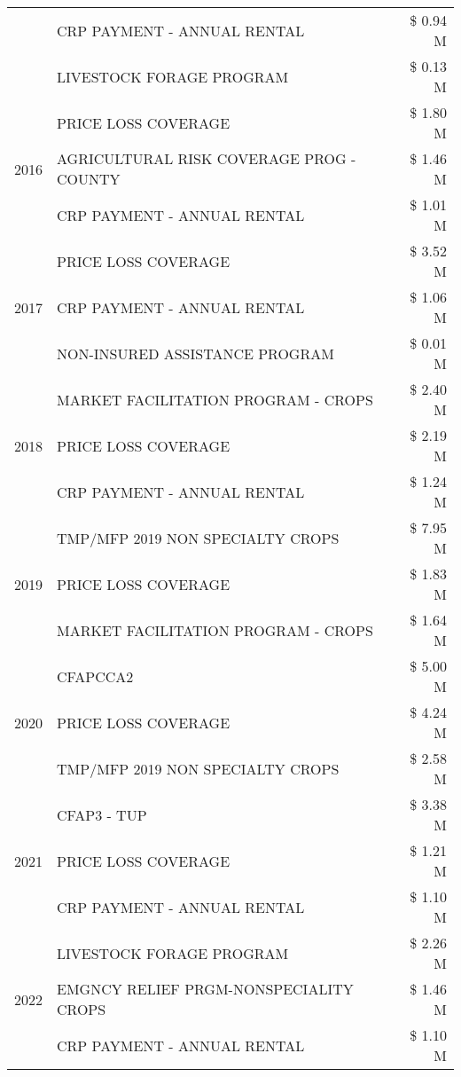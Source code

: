 \begin{tabular}{llr}
 & CRP PAYMENT - ANNUAL RENTAL & \$ 0.94 M \\
 & LIVESTOCK FORAGE PROGRAM & \$ 0.13 M \\
\cline{1-3}
\multirow[t]{3}{*}{2016} & PRICE LOSS COVERAGE & \$ 1.80 M \\
 & AGRICULTURAL RISK COVERAGE PROG - COUNTY & \$ 1.46 M \\
 & CRP PAYMENT - ANNUAL RENTAL & \$ 1.01 M \\
\cline{1-3}
\multirow[t]{3}{*}{2017} & PRICE LOSS COVERAGE & \$ 3.52 M \\
 & CRP PAYMENT - ANNUAL RENTAL & \$ 1.06 M \\
 & NON-INSURED ASSISTANCE PROGRAM & \$ 0.01 M \\
\cline{1-3}
\multirow[t]{3}{*}{2018} & MARKET FACILITATION PROGRAM - CROPS & \$ 2.40 M \\
 & PRICE LOSS COVERAGE & \$ 2.19 M \\
 & CRP PAYMENT - ANNUAL RENTAL & \$ 1.24 M \\
\cline{1-3}
\multirow[t]{3}{*}{2019} & TMP/MFP 2019 NON SPECIALTY CROPS & \$ 7.95 M \\
 & PRICE LOSS COVERAGE & \$ 1.83 M \\
 & MARKET FACILITATION PROGRAM - CROPS & \$ 1.64 M \\
\cline{1-3}
\multirow[t]{3}{*}{2020} & CFAPCCA2 & \$ 5.00 M \\
 & PRICE LOSS COVERAGE & \$ 4.24 M \\
 & TMP/MFP 2019 NON SPECIALTY CROPS & \$ 2.58 M \\
\cline{1-3}
\multirow[t]{3}{*}{2021} & CFAP3 - TUP & \$ 3.38 M \\
 & PRICE LOSS COVERAGE & \$ 1.21 M \\
 & CRP PAYMENT - ANNUAL RENTAL & \$ 1.10 M \\
\cline{1-3}
\multirow[t]{3}{*}{2022} & LIVESTOCK FORAGE PROGRAM & \$ 2.26 M \\
 & EMGNCY RELIEF PRGM-NONSPECIALITY CROPS & \$ 1.46 M \\
 & CRP PAYMENT - ANNUAL RENTAL & \$ 1.10 M \\
\cline{1-3}
\bottomrule
\end{tabular}
